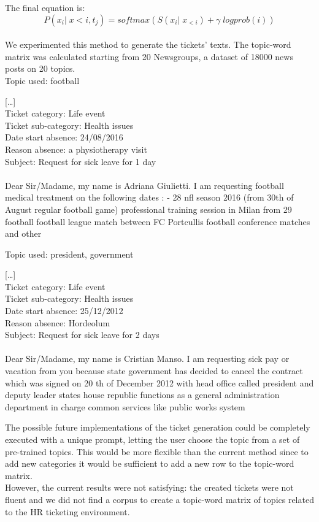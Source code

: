 The final equation is:
\begin{equation*}
    P(x_i|\;x{<i},t_j) = softmax(S(x_i|\;x_{<i}) + \gamma\;logprob(i))
\end{equation*}
\\
We experimented this method to generate the tickets' texts. The topic-word matrix was calculated starting from 20 Newsgroups, a dataset of 18000 news posts on 20 topics. \\

Topic used: football
\begin{adjustwidth}{1cm}{}
    [\dots] \\
    Ticket category: Life event\\
    Ticket sub-category: Health issues\\
    Date start absence: 24/08/2016\\
    Reason absence: a physiotherapy visit\\
    Subject: Request for sick leave for 1 day\\\\
    Dear Sir/Madame, my name is Adriana Giulietti. I am requesting football medical treatment on the following dates : - 28 nfl season 2016 (from 30th of August regular football game) professional training session in Milan from 29 football football league match between FC Portcullis football conference matches and other 
\end{adjustwidth}

Topic used: president, government
\begin{adjustwidth}{1cm}{}
    [\dots] \\
    Ticket category: Life event\\
    Ticket sub-category: Health issues\\
    Date start absence: 25/12/2012\\
    Reason absence: Hordeolum\\
    Subject: Request for sick leave for 2 days\\\\
    Dear Sir/Madame, my name is Cristian Manso. I am requesting sick pay or vacation from you because state government has decided to cancel the contract which was signed on 20 th of 
    December 2012 with head office called president and deputy leader states house republic functions as a general administration department in charge common services like public works system
    \end{adjustwidth}

    

The possible future implementations of the ticket generation could be completely executed with a unique prompt, letting the user choose the topic from a set of pre-trained topics. This would be more flexible than the current method since to add new categories it would be sufficient to add a new row to the topic-word matrix. \\
However, the current results were not satisfying: the created tickets were not fluent and we did not find a corpus to create a topic-word matrix of topics related to the HR ticketing environment.


